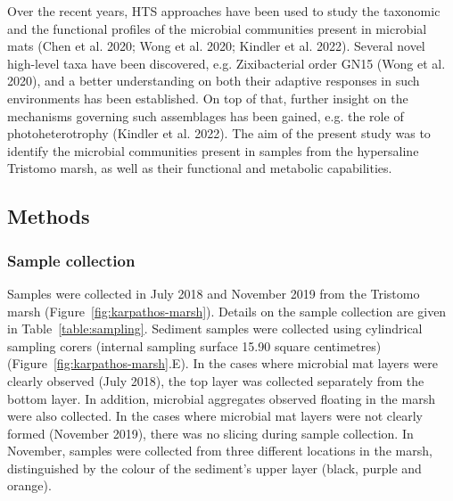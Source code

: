    Over the recent years, HTS approaches have been used to study the taxonomic and the functional profiles of the microbial communities present in microbial mats 
   (Chen et al. 2020; Wong et al. 2020; Kindler et al. 2022). 
   Several novel high-level taxa have been discovered, e.g. Zixibacterial order GN15 (Wong et al. 2020), 
   and a better understanding on both their adaptive responses in such environments has been established. 
   On top of that, further insight on the mechanisms governing such assemblages has been gained, e.g. the role of photoheterotrophy 
   (Kindler et al. 2022). 
   The aim of the present study was to identify the microbial communities present in samples from the 
   hypersaline Tristomo marsh, as well as their functional and metabolic capabilities.




\subsection{Methods}


\subsubsection*{Sample collection}

   Samples were collected in July 2018 and November 2019 from the Tristomo marsh (Figure~\ref{fig:karpathos-marsh}). 
   Details on the sample collection are given in Table~\ref{table:sampling}. 
   Sediment samples were collected using cylindrical sampling corers (internal sampling surface 15.90 square centimetres) (Figure~\ref{fig:karpathos-marsh}.E). 
   In the cases where microbial mat layers were clearly observed (July 2018), the top layer was collected separately from the bottom layer. 
   In addition, microbial aggregates observed floating in the marsh were also collected. 
   In the cases where microbial mat layers were not clearly formed (November 2019), there was no slicing during sample collection. 
   In November, samples were collected from three different locations in the marsh, distinguished by the colour of the sediment’s upper layer (black, purple and orange). 

